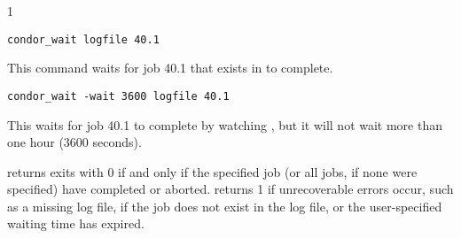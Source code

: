 \begin{ManPage}{\label{man-condor-wait}}{1}
\begin{verbatim}
condor_wait logfile 40.1
\end{verbatim}
This command waits for job 40.1 that exists in  to
complete.

\begin{verbatim}
condor_wait -wait 3600 logfile 40.1
\end{verbatim}
This waits for job 40.1 to
complete by watching , but it will not wait more than one
hour (3600 seconds).

\ExitStatus

 returns exits with 0 if and only if the specified job
(or all jobs, if none were specified) have completed or
aborted.  returns 1 if unrecoverable errors occur, such
as a missing log file, if the job does not exist in the log file, or
the user-specified waiting time has expired.

\end{ManPage}
